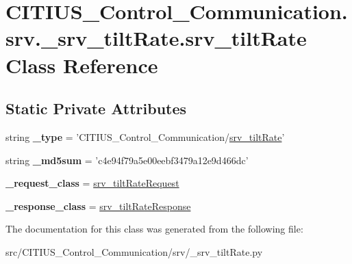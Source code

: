 \hypertarget{class_c_i_t_i_u_s___control___communication_1_1srv_1_1__srv__tilt_rate_1_1srv__tilt_rate}{\section{\-C\-I\-T\-I\-U\-S\-\_\-\-Control\-\_\-\-Communication.\-srv.\-\_\-srv\-\_\-tilt\-Rate.\-srv\-\_\-tilt\-Rate \-Class \-Reference}
\label{class_c_i_t_i_u_s___control___communication_1_1srv_1_1__srv__tilt_rate_1_1srv__tilt_rate}
}
\subsection*{\-Static \-Private \-Attributes}
\begin{DoxyCompactItemize}
\item 
\hypertarget{class_c_i_t_i_u_s___control___communication_1_1srv_1_1__srv__tilt_rate_1_1srv__tilt_rate_ab451522b218bb215167e086e104d0eaa}{string {\bfseries \-\_\-type} = '\-C\-I\-T\-I\-U\-S\-\_\-\-Control\-\_\-\-Communication/\hyperlink{class_c_i_t_i_u_s___control___communication_1_1srv_1_1__srv__tilt_rate_1_1srv__tilt_rate}{srv\-\_\-tilt\-Rate}'}\label{class_c_i_t_i_u_s___control___communication_1_1srv_1_1__srv__tilt_rate_1_1srv__tilt_rate_ab451522b218bb215167e086e104d0eaa}

\item 
\hypertarget{class_c_i_t_i_u_s___control___communication_1_1srv_1_1__srv__tilt_rate_1_1srv__tilt_rate_a0fa0d2c484063e30b9f929a7dd59e5e7}{string {\bfseries \-\_\-md5sum} = 'c4e94f79a5e00eebf3479a12e9d466dc'}\label{class_c_i_t_i_u_s___control___communication_1_1srv_1_1__srv__tilt_rate_1_1srv__tilt_rate_a0fa0d2c484063e30b9f929a7dd59e5e7}

\item 
\hypertarget{class_c_i_t_i_u_s___control___communication_1_1srv_1_1__srv__tilt_rate_1_1srv__tilt_rate_a2fca6443156165bd9185951abc5abac3}{{\bfseries \-\_\-request\-\_\-class} = \hyperlink{class_c_i_t_i_u_s___control___communication_1_1srv_1_1__srv__tilt_rate_1_1srv__tilt_rate_request}{srv\-\_\-tilt\-Rate\-Request}}\label{class_c_i_t_i_u_s___control___communication_1_1srv_1_1__srv__tilt_rate_1_1srv__tilt_rate_a2fca6443156165bd9185951abc5abac3}

\item 
\hypertarget{class_c_i_t_i_u_s___control___communication_1_1srv_1_1__srv__tilt_rate_1_1srv__tilt_rate_a3491174f5f9e3a9972ec00871926af6f}{{\bfseries \-\_\-response\-\_\-class} = \hyperlink{class_c_i_t_i_u_s___control___communication_1_1srv_1_1__srv__tilt_rate_1_1srv__tilt_rate_response}{srv\-\_\-tilt\-Rate\-Response}}\label{class_c_i_t_i_u_s___control___communication_1_1srv_1_1__srv__tilt_rate_1_1srv__tilt_rate_a3491174f5f9e3a9972ec00871926af6f}

\end{DoxyCompactItemize}


\-The documentation for this class was generated from the following file\-:\begin{DoxyCompactItemize}
\item 
src/\-C\-I\-T\-I\-U\-S\-\_\-\-Control\-\_\-\-Communication/srv/\-\_\-srv\-\_\-tilt\-Rate.\-py\end{DoxyCompactItemize}
